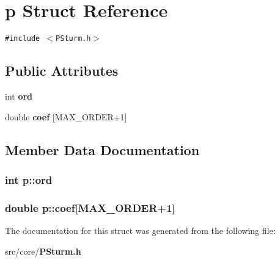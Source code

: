 \section{p Struct Reference}
\label{structp}
{\tt \#include $<$PSturm.h$>$}

\subsection*{Public Attributes}
\begin{CompactItemize}
\item 
int {\bf ord}
\item 
double {\bf coef} [MAX\_\-ORDER+1]
\end{CompactItemize}


\subsection{Member Data Documentation}
\subsubsection{\setlength{\rightskip}{0pt plus 5cm}int {\bf p::ord}}\label{structp_aec401685a94aab9324475f03be5eef0}


\subsubsection{\setlength{\rightskip}{0pt plus 5cm}double {\bf p::coef}[MAX\_\-ORDER+1]}\label{structp_b464f3952f247554f8dbe8357c8178c5}




The documentation for this struct was generated from the following file:\begin{CompactItemize}
\item 
src/core/{\bf PSturm.h}\end{CompactItemize}

